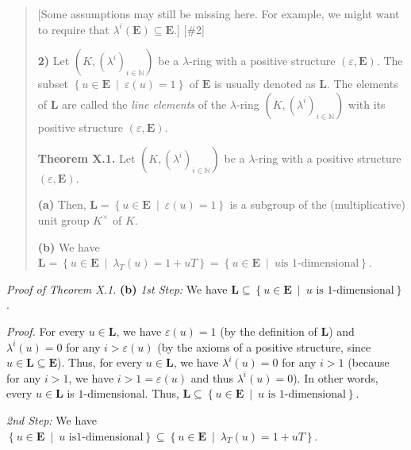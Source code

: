 \documentclass[numbers=enddot,12pt,final,onecolumn,notitlepage]{scrartcl}%
\begin{document}
\begin{quote}
[Some assumptions may still be missing here. For example, we might want to
require that $\lambda^{i}\left(  \mathbf{E}\right)  \subseteq\mathbf{E}$.] [\#2]

\textbf{2)} Let $\left(  K,\left(  \lambda^{i}\right)  _{i\in\mathbb{N}%
}\right)  $ be a $\lambda$-ring with a positive structure $\left(
\varepsilon,\mathbf{E}\right)  .$ The subset $\left\{  u\in\mathbf{E}%
\ \mid\ \varepsilon\left(  u\right)  =1\right\}  $ of $\mathbf{E}$ is usually
denoted as $\mathbf{L}$. The elements of $\mathbf{L}$ are called the
\textit{line elements} of the $\lambda$-ring $\left(  K,\left(  \lambda
^{i}\right)  _{i\in\mathbb{N}}\right)  $ with its positive structure $\left(
\varepsilon,\mathbf{E}\right)  $.

\textbf{Theorem X.1.} Let $\left(  K,\left(  \lambda^{i}\right)
_{i\in\mathbb{N}}\right)  $ be a $\lambda$-ring with a positive structure
$\left(  \varepsilon,\mathbf{E}\right)  .$

\textbf{(a)} Then, $\mathbf{L}=\left\{  u\in\mathbf{E}\ \mid\ \varepsilon
\left(  u\right)  =1\right\}  $ is a subgroup of the (multiplicative) unit
group $K^{\times}$ of $K$.

\textbf{(b)} We have $\mathbf{L}=\left\{  u\in\mathbf{E}\ \mid\ \lambda
_{T}\left(  u\right)  =1+uT\right\}  =\left\{  u\in\mathbf{E}\ \mid\ u\text{
is }1\text{-dimensional}\right\}  $.
\end{quote}

\textit{Proof of Theorem X.1.} \textbf{(b)} \textit{1st Step:} We have
$\mathbf{L}\subseteq\left\{  u\in\mathbf{E}\ \mid\ u\text{ is }%
1\text{-dimensional}\right\}  $.

\textit{Proof.} For every $u\in\mathbf{L}$, we have $\varepsilon\left(
u\right)  =1$ (by the definition of $\mathbf{L}$) and $\lambda^{i}\left(
u\right)  =0$ for any $i>\varepsilon\left(  u\right)  $ (by the axioms of a
positive structure, since $u\in\mathbf{L}\subseteq\mathbf{E}$). Thus, for
every $u\in\mathbf{L}$, we have $\lambda^{i}\left(  u\right)  =0$ for any
$i>1$ (because for any $i>1$, we have $i>1=\varepsilon\left(  u\right)  $ and
thus $\lambda^{i}\left(  u\right)  =0$). In other words, every $u\in
\mathbf{L}$ is $1$-dimensional. Thus, $\mathbf{L}\subseteq\left\{
u\in\mathbf{E}\ \mid\ u\text{ is }1\text{-dimensional}\right\}  $.

\textit{2nd Step:} We have $\left\{  u\in\mathbf{E}\ \mid\ u\text{ is
}1\text{-dimensional}\right\}  \subseteq\left\{  u\in\mathbf{E}\ \mid
\ \lambda_{T}\left(  u\right)  =1+uT\right\}  $.
\end{document}
